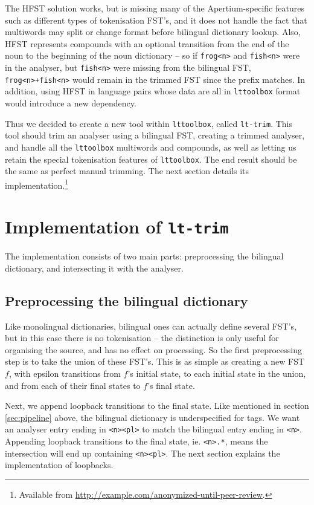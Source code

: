 \documentclass[10pt, a4paper]{article}
\newcommand{\ana}[1]{\texttt{#1}}
\newcommand{\tool}[1]{\texttt{#1}}
\begin{document}
The HFST solution works, but is missing many of the Apertium-specific
features such as different types of tokenisation FST's, and it does
not handle the fact that multiwords may split or change format before
bilingual dictionary lookup. Also, HFST represents compounds with an
optional transition from the end of the noun to the beginning of the
noun dictionary -- so if \ana{frog<n>} and \ana{fish<n>} were in the
analyser, but \ana{fish<n>} were missing from the bilingual FST,
\ana{frog<n>+fish<n>} would remain in the trimmed FST since the prefix
matches. In addition, using HFST in language pairs whose data are all
in \tool{lttoolbox} format would introduce a new dependency.

Thus we decided to create a new tool within \tool{lttoolbox}, called
\tool{lt-trim}. This tool should trim an analyser using a bilingual
FST, creating a trimmed analyser, and handle all the \tool{lttoolbox}
multiwords and compounds, as well as letting us retain the special
tokenisation features of \tool{lttoolbox}. The end result should be
the same as perfect manual trimming. The next section details its
implementation.\footnote{Available from
  \href{http://example.com/anonymized-until-peer-review}{http://example.com/anonymized-until-peer-review}.}


\section{Implementation of \tool{lt-trim}}

The implementation consists of two main parts: preprocessing the
bilingual dictionary, and intersecting it with the analyser. 


\subsection{Preprocessing the bilingual dictionary}

Like monolingual dictionaries, bilingual ones can actually define
several FST's, but in this case there is no tokenisation -- the
distinction is only useful for organising the source, and has no
effect on processing. So the first preprocessing step is to take the
union of these FST's. This is as simple as creating a new FST $f$,
with epsilon transitions from $f$'s initial state, to each initial
state in the union, and from each of their final states to $f$'s final
state.

Next, we append loopback transitions to the final state. Like
mentioned in section \ref{sec:pipeline} above, the bilingual
dictionary is underspecified for tags. We want an analyser entry
ending in \ana{<n><pl>} to match the bilingual entry ending in
\ana{<n>}. Appending loopback transitions to the final state, ie.
\ana{<n>.*}, means the intersection will end up containing
\ana{<n><pl>}. The next section explains the implementation of
loopbacks.
\end{document}
